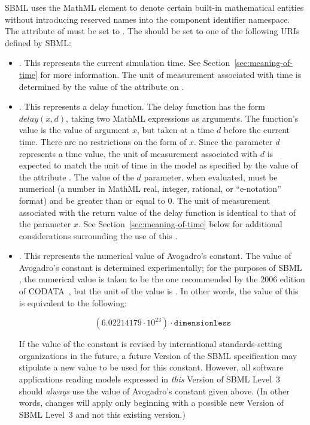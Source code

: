 SBML \thisL uses the MathML  element to denote
certain built-in mathematical entities without introducing
reserved names into the component identifier namespace.  The
 attribute of  must be set to
.  The  should be set to one of the
following URIs defined by SBML:
\begin{itemize}

\item {}.  This
  represents the current simulation time.  See
  Section~\ref{sec:meaning-of-time} for more information.  The
  unit of measurement associated with time is determined by the
  value of the attribute  on \Model.

\item {}.  This
  represents a delay function.  The delay function has the form
  $delay(x, d)$, taking two MathML expressions as arguments.  The
  function's value is the value of argument $x$, but taken at a
  time $d$ before the current time.  There are no restrictions on
  the form of $x$.  Since the parameter $d$ represents a time
  value, the unit of measurement associated with $d$ is expected
  to match the unit of time in the model as specified by the value
  of the \Model attribute .  The value of the $d$
  parameter, when evaluated, must be numerical (\ie a number in
  MathML real, integer, rational, or ``e-notation'' format) and be
  greater than or equal to 0.  The unit of measurement associated
  with the return value of the delay function is identical to that
  of the parameter $x$.  See Section~\ref{sec:meaning-of-time}
  below for additional considerations surrounding the use of this
  .

\item {}.  This
  represents the numerical value of Avogadro's constant.  The
  value of Avogadro's constant is determined experimentally; for
  the purposes of SBML \thisLVnum, the numerical value is taken to
  be the one recommended by the 2006 edition of
  CODATA~\citep{codata_2008}, but the unit of the value is
  .  In other words, the value of this
   is equivalent to the following:
  \begin{linenomath}
    \begin{equation*}
      (6.02214179 \cdot 10^{23}) \cdot \texttt{dimensionless}
    \end{equation*}
  \end{linenomath}
  If the value of the constant is revised by international
  standards-setting organizations in the future, a future Version
  of the SBML \thisL specification may stipulate a new value to be
  used for this  constant.  However, all software
  applications reading models expressed in \emph{this} Version of
  SBML Level~3 should \emph{always} use the value of Avogadro's
  constant given above.  (In other words, changes will apply only
  beginning with a possible new Version of SBML Level~3 and not
  this existing version.)


\end{itemize}
